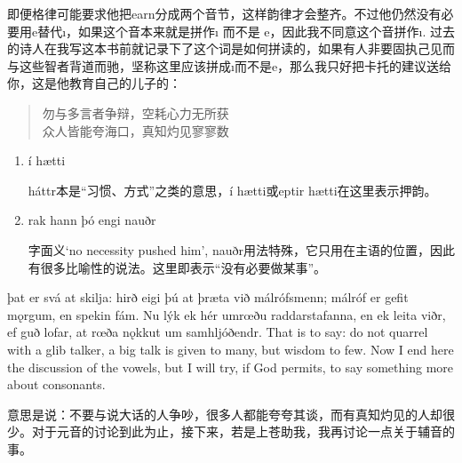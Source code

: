 \begin{translation*}{}
    即便格律可能要求他把earn分成两个音节，这样韵律才会整齐。不过他仍然没有必要用e替代ı，如果这个音本来就是拼作ı 而不是 e，因此我不同意这个音拼作ı. 过去的诗人在我写这本书前就记录下了这个词是如何拼读的，如果有人非要固执己见而与这些智者背道而驰，坚称这里应该拼成ı而不是e，那么我只好把卡托的建议送给你，这是他教育自己的儿子的：
    \begin{quote}
        勿与多言者争辩，空耗心力无所获\\
        众人皆能夸海口，真知灼见寥寥数
    \end{quote}

\end{translation*}
\begin{grammar*}{}
    \begin{enumerate}[leftmargin=*]
        \item í hætti

              háttr本是“习惯、方式”之类的意思，í hætti或eptir hætti在这里表示押韵。

        \item rak hann þó engi nauðr

              字面义`no necessity pushed him', nauðr用法特殊，它只用在主语的位置，因此有很多比喻性的说法。这里即表示“没有必要做某事”。
    \end{enumerate}
\end{grammar*}
\begin{paracol}{2}
    þat er svá at skilja: hirð eigi þú at þræta við málrófsmenn; málróf er gefit mǫrgum, en spekin fám. Nu lýk ek hér umrœðu raddarstafanna, en ek leita viðr, ef guð lofar, at rœða nǫkkut um samhljóðendr.
    \switchcolumn
    That is to say: do not quarrel with a glib talker, a big talk is given to many, but wisdom to few. Now I end here the discussion of the vowels, but I will try, if God permits, to say something more about consonants.
\end{paracol}
\begin{translation*}{}
    意思是说：不要与说大话的人争吵，很多人都能夸夸其谈，而有真知灼见的人却很少。对于元音的讨论到此为止，接下来，若是上苍助我，我再讨论一点关于辅音的事。
\end{translation*}


